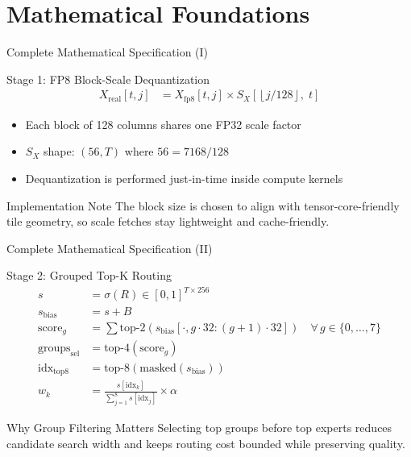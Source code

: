 \documentclass[aspectratio=169,11pt]{beamer}
\begin{document}
\section{Mathematical Foundations}

\begin{frame}[t]{Complete Mathematical Specification (I)}
\small
\begin{block}{Stage 1: FP8 Block-Scale Dequantization}
\vspace{-0.2cm}
\begin{align}
X_{\text{real}}[t, j] &= X_{\text{fp8}}[t, j] \times S_X\!\left[\left\lfloor j/128 \right\rfloor,\; t\right]
\end{align}
\vspace{-0.2cm}
\begin{itemize}
    \item Each block of 128 columns shares one FP32 scale factor
    \item $S_X$ shape: $(56, T)$ where $56 = 7168/128$
    \item Dequantization is performed just-in-time inside compute kernels
\end{itemize}
\end{block}

\begin{exampleblock}{Implementation Note}
The block size is chosen to align with tensor-core-friendly tile geometry, so scale fetches stay lightweight and cache-friendly.
\end{exampleblock}
\end{frame}

\begin{frame}[t]{Complete Mathematical Specification (II)}
\small
\begin{block}{Stage 2: Grouped Top-K Routing}
\vspace{-0.2cm}
\begin{align}
s &= \sigma(R) \in [0,1]^{T \times 256} \\
s_{\text{bias}} &= s + B \\
\text{score}_g &= \sum \text{top-}2(s_{\text{bias}}[\cdot, g \cdot 32:(g{+}1) \cdot 32])
\quad \forall\, g \in \{0,\dots,7\} \\
\text{groups}_{\text{sel}} &= \text{top-}4(\text{score}_g) \\
\text{idx}_{\text{top8}} &= \text{top-}8\!\left(\text{masked}(s_{\text{bias}})\right) \\
w_k &= \frac{s[\text{idx}_k]}{\sum_{j=1}^{8} s[\text{idx}_j]} \times \alpha
\end{align}
\end{block}

\begin{alertblock}{Why Group Filtering Matters}
Selecting top groups before top experts reduces candidate search width and keeps routing cost bounded while preserving quality.
\end{alertblock}
\end{frame}
\end{document}
